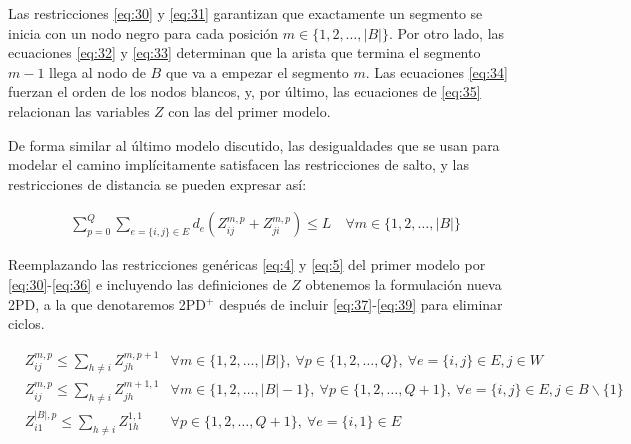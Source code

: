 \documentclass[10pt, a4paper]{article}
\theoremstyle{definition}
\begin{document}
Las restricciones \ref{eq:30} y \ref{eq:31} garantizan que exactamente un segmento se inicia con un nodo negro para cada posición $m \in\{1,2, \ldots,|B|\}$. Por otro lado, las ecuaciones \ref{eq:32} y \ref{eq:33} determinan que la arista que termina el segmento $m-1$ llega al nodo de $B$ que va a empezar el segmento $m$. Las ecuaciones \ref{eq:34} fuerzan el orden de los nodos blancos, y, por último, las ecuaciones de \ref{eq:35} relacionan las variables $Z$ con las del primer modelo.

De forma similar al último modelo discutido, las desigualdades que se usan para modelar el camino implícitamente satisfacen las restricciones de salto, y las restricciones de distancia se pueden expresar así:

\begin{align}
	& \sum_{p=0}^{Q} \sum_{e=\{i, j\} \in E} d_{e}\left(Z_{i j}^{m, p}+Z_{j i}^{m, p}\right) \leq L \quad \forall m \in\{1,2, \ldots,|B|\} \label{eq:36}
\end{align}

Reemplazando las restricciones genéricas \ref{eq:4} y \ref{eq:5} del primer modelo por \ref{eq:30}-\ref{eq:36} e incluyendo las definiciones de $Z$ obtenemos la formulación nueva 2PD, a la que denotaremos 2PD$^{+}$ después de incluir \ref{eq:37}-\ref{eq:39} para eliminar ciclos.

\begin{align}
	& Z_{i j}^{m, p} \leq \sum_{h \neq i} Z_{j h}^{m, p+1} & \forall m \in\{1,2, \ldots,|B|\},\ \forall p \in\{1,2, \ldots, Q\},\ \forall e=\{i, j\} \in E, j \in W \label{eq:37} \\
	& Z_{i j}^{m, p} \leq \sum_{h \neq i} Z_{j h}^{m+1,1} & \forall m \in\{1,2, \ldots,|B|-1\},\ \forall p \in\{1,2, \ldots, Q+1\},\ \forall e=\{i, j\} \in E, j \in B \backslash\{1\} \label{eq:38} \\
	& Z_{i 1}^{|B|, p} \leq \sum_{h \neq i} Z_{1 h}^{1,1} & \forall p \in\{1,2, \ldots, Q+1\},\ \forall e=\{i, 1\} \in E \label{eq:39}
\end{align}
\end{document}
